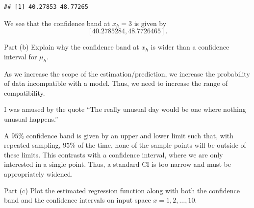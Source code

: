 \documentclass[
]{article}
\begin{document}
\begin{verbatim}
## [1] 40.27853 48.77265
\end{verbatim}

We see that the confidence band at \(x_h = 3\) is given by \[
  [40.2785284, 48.7726465].
\]

\begin{tcolorbox}[split=\f]
Part (b)
\tcblower
Explain why the confidence band at $x_h$ is wider than a confidence interval
for $\mu_h$.
\end{tcolorbox}

As we increase the scope of the estimation/prediction, we increase the
probability of data incompatible with a model. Thus, we need to increase
the range of compatibility.

I was amused by the quote ``The really unusual day would be one where
nothing unusual happens.''

A \(95\%\) confidence band is given by an upper and lower limit such
that, with repeated sampling, \(95\%\) of the time, none of the sample
points will be outside of these limits. This contrasts with a confidence
interval, where we are only interested in a single point. Thus, a
standard CI is too narrow and must be appropriately widened.

\begin{tcolorbox}[split=\f]
Part (c)
\tcblower
Plot the estimated regression function along with both the confidence band and
the confidence intervals on input space $x=1,2,\ldots,10$.
\end{tcolorbox}
\end{document}
